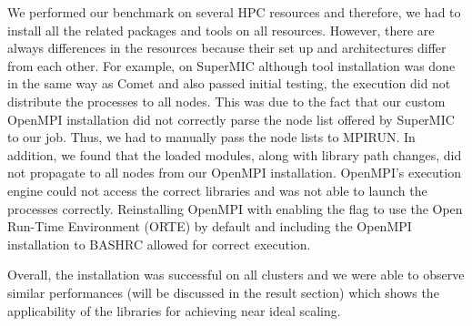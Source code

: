We performed our benchmark on several HPC resources and therefore, we had to install all the related packages and tools on all resources.
However, there are always differences in the resources because their set up and architectures differ from each other. 
For example, on SuperMIC although tool installation was done in the same way as Comet and also passed initial testing, the execution did not distribute the processes to all nodes. 
This was due to the fact that our custom OpenMPI installation did not correctly parse the node list offered by SuperMIC to our job. 
Thus, we had to manually pass the node lists to MPIRUN. 
In addition, we found that the loaded modules, along with library path changes, did not propagate to all nodes from our OpenMPI installation. 
OpenMPI's execution engine could not access the correct libraries and was not able to launch the processes correctly. 
Reinstalling OpenMPI with enabling the flag to use the Open Run-Time Environment (ORTE) by default and including the OpenMPI installation to BASHRC allowed for correct execution.
 
Overall, the installation was successful on all clusters and we were able to observe similar
performances (will be discussed in the result section) which shows the applicability of the 
libraries for achieving near ideal scaling. 

